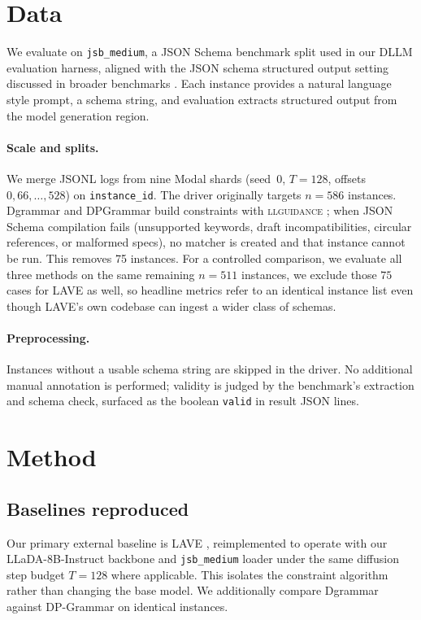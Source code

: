 \section{Data}
\label{sec:data}

We evaluate on \texttt{jsb\_medium}, a JSON Schema benchmark split used in our DLLM evaluation harness, aligned with the JSON schema structured output setting discussed in broader benchmarks \citep{geng2025jsonschemabenchrigorousbenchmarkstructured}. Each instance provides a natural language style prompt, a schema string, and evaluation extracts structured output from the model generation region.

\paragraph{Scale and splits.}
We merge JSONL logs from nine Modal shards (seed~$0$, $T{=}128$, offsets $0,66,\ldots,528$) on \texttt{instance\_id}. The driver originally targets $n{=}586$ instances. Dgrammar and DPGrammar build constraints with \textsc{llguidance} \citep{microsoft2025llguidance}; when JSON Schema compilation fails (unsupported keywords, draft incompatibilities, circular references, or malformed specs), no matcher is created and that instance cannot be run. This removes 75 instances. For a controlled comparison, we evaluate all three methods on the same remaining $n{=}511$ instances, we exclude those $75$ cases for LAVE as well, so headline metrics refer to an identical instance list even though LAVE's own codebase can ingest a wider class of schemas.


\paragraph{Preprocessing.}
Instances without a usable schema string are skipped in the driver. No additional manual annotation is performed; validity is judged by the benchmark's extraction and schema check, surfaced as the boolean \texttt{valid} in result JSON lines.

\section{Method}
\label{sec:method}

\subsection{Baselines reproduced}
Our primary external baseline is LAVE \citep{zhang2026lookaheadthenverifyreliableconstraineddecoding}, reimplemented to operate with our LLaDA-8B-Instruct backbone and \texttt{jsb\_medium} loader under the same diffusion step budget $T{=}128$ where applicable. This isolates the constraint algorithm rather than changing the base model. We additionally compare Dgrammar against DP-Grammar on identical instances.

